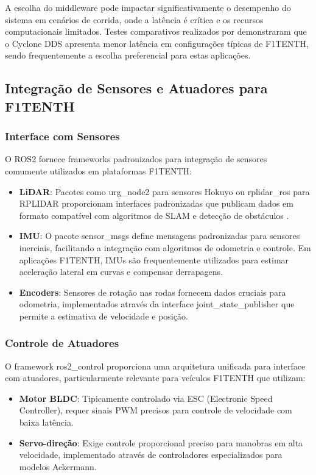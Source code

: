 A escolha do middleware pode impactar significativamente o desempenho do
sistema em cenários de corrida, onde a latência é crítica e os recursos
computacionais limitados. Testes comparativos realizados por
\cite{kronauer2021latency} demonstraram que o Cyclone DDS apresenta menor
latência em configurações típicas de F1TENTH, sendo frequentemente a escolha
preferencial para estas aplicações.

\subsection{Integração de Sensores e Atuadores para F1TENTH}

\subsubsection{Interface com Sensores}

O ROS2 fornece frameworks padronizados para integração de sensores comumente
utilizados em plataformas F1TENTH:

\begin{itemize}
    \item \textbf{LiDAR}: Pacotes como urg\_node2 para sensores Hokuyo ou rplidar\_ros para RPLIDAR proporcionam interfaces padronizadas que publicam dados em formato compatível com algoritmos de SLAM e detecção de obstáculos \cite{quigley2015programming}.
    \item \textbf{IMU}: O pacote sensor\_msgs define mensagens padronizadas para sensores inerciais, facilitando a integração com algoritmos de odometria e controle. Em aplicações F1TENTH, IMUs são frequentemente utilizados para estimar aceleração lateral em curvas e compensar derrapagens.
    \item \textbf{Encoders}: Sensores de rotação nas rodas fornecem dados cruciais para odometria, implementados através da interface joint\_state\_publisher que permite a estimativa de velocidade e posição.
\end{itemize}

\subsubsection{Controle de Atuadores}

O framework ros2\_control proporciona uma arquitetura unificada para interface
com atuadores, particularmente relevante para veículos F1TENTH que utilizam:

\begin{itemize}
    \item \textbf{Motor BLDC}: Tipicamente controlado via ESC (Electronic Speed Controller), requer sinais PWM precisos para controle de velocidade com baixa latência.
    \item \textbf{Servo-direção}: Exige controle proporcional preciso para manobras em alta velocidade, implementado através de controladores especializados para modelos Ackermann.
\end{itemize}

